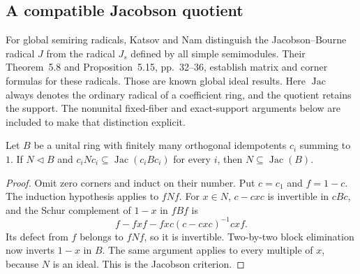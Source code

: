 \subsection{A compatible Jacobson quotient}
For global semiring radicals, Katsov and Nam
\cite[Examples~3.6--3.7, pp.~14--15 of the preprint]{KatsovNamRadicals}
distinguish the Jacobson--Bourne radical $J$ from the radical $J_s$
defined by all simple semimodules. Their Theorem~5.8 and
Proposition~5.15, pp.~32--36, establish matrix and corner formulas
for these radicals. Those are known global ideal results. Here
$\operatorname{Jac}$ always denotes the ordinary radical of a
coefficient ring, and the quotient retains the support. The
nonunital fixed-fiber and exact-support arguments below are included
to make that distinction explicit.

\begin{lemma}\label{lem:finite-peirce-jacobson}
Let $B$ be a unital ring with finitely many orthogonal idempotents
$c_i$ summing to $1$. If $N\lhd B$ and
$c_iNc_i\subseteq\operatorname{Jac}(c_iBc_i)$ for every $i$, then
$N\subseteq\operatorname{Jac}(B)$.
\end{lemma}
\begin{proof}
Omit zero corners and induct on their number. Put $c=c_1$ and
$f=1-c$. The induction hypothesis applies to $fNf$. For $x\in N$,
$c-cxc$ is invertible in $cBc$, and the Schur complement of
$1-x$ in $fBf$ is
\[
 f-fxf-fxc(c-cxc)^{-1}cxf.
\]
Its defect from $f$ belongs to $fNf$, so it is invertible.
Two-by-two block elimination now inverts $1-x$ in $B$.
The same argument applies to every multiple of $x$, because $N$
is an ideal. This is the Jacobson criterion.
\end{proof}


